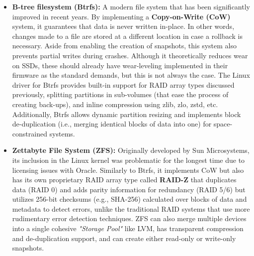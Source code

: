 \begin{itemize}
    \item \textbf{B-tree filesystem (Btrfs):} A modern file system that has
          been significantly improved in recent years. By implementing a
          \textbf{Copy-on-Write (CoW)} system, it guarantees that data is
          never written in-place. In other words, changes made to a file are
          stored at a different location in case a rollback is necessary. Aside
          from enabling the creation of snapshots, this system also prevents
          partial writes during crashes. Although it theoretically reduces
          wear on SSDs, these should already have wear-leveling implemented in
          their firmware as the standard demands, but this is not always the
          case. The Linux driver for Btrfs provides built-in support for RAID
          array types discussed previously, splitting partitions in sub-volumes
          (that ease the process of creating back-ups), and inline compression
          using zlib, zlo, zstd, etc. Additionally, Btrfs allows dynamic
          partition resizing and implements block de-duplication (i.e., merging
          identical blocks of data into one) for space-constrained systems.

    \item \textbf{Zettabyte File System (ZFS):} Originally developed by Sun
          Microsystems, its inclusion in the Linux kernel was problematic for
          the longest time due to licensing issues with Oracle. Similarly to
          Btrfs, it implements CoW but also has its own proprietary RAID array
          type called \textbf{RAID-Z} that duplicates data (RAID 0) and adds
          parity information for redundancy (RAID 5/6) but utilizes 256-bit
          checksums (e.g., SHA-256) calculated over blocks of data and metadata
          to detect errors, unlike the traditional RAID systems that use more
          rudimentary error detection techniques. ZFS can also merge multiple
          devices into a single cohesive \textit{"Storage Pool"} like LVM, has
          transparent compression and de-duplication support, and can create
          either read-only or write-only snapshots.
\end{itemize}


